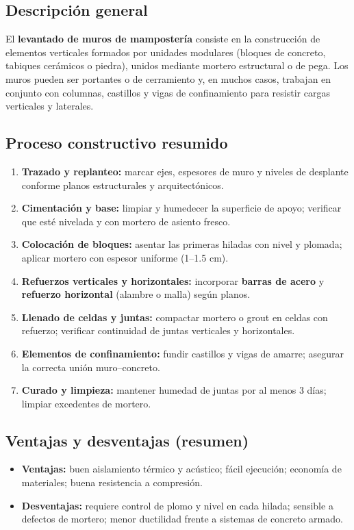 \documentclass[12pt]{article}
\begin{document}
	\subsection*{Descripción general}
	El \textbf{levantado de muros de mampostería} consiste en la construcción de elementos verticales formados por unidades modulares (bloques de concreto, tabiques cerámicos o piedra), unidos mediante mortero estructural o de pega. Los muros pueden ser portantes o de cerramiento y, en muchos casos, trabajan en conjunto con columnas, castillos y vigas de confinamiento para resistir cargas verticales y laterales.
	
	\subsection*{Proceso constructivo resumido}
	\begin{enumerate}[leftmargin=*, itemsep=2pt]
		\item \textbf{Trazado y replanteo:} marcar ejes, espesores de muro y niveles de desplante conforme planos estructurales y arquitectónicos.
		\item \textbf{Cimentación y base:} limpiar y humedecer la superficie de apoyo; verificar que esté nivelada y con mortero de asiento fresco.
		\item \textbf{Colocación de bloques:} asentar las primeras hiladas con nivel y plomada; aplicar mortero con espesor uniforme (1–1.5 cm).
		\item \textbf{Refuerzos verticales y horizontales:} incorporar \textbf{barras de acero} y \textbf{refuerzo horizontal} (alambre o malla) según planos.
		\item \textbf{Llenado de celdas y juntas:} compactar mortero o grout en celdas con refuerzo; verificar continuidad de juntas verticales y horizontales.
		\item \textbf{Elementos de confinamiento:} fundir castillos y vigas de amarre; asegurar la correcta unión muro–concreto.
		\item \textbf{Curado y limpieza:} mantener humedad de juntas por al menos 3 días; limpiar excedentes de mortero.
	\end{enumerate}
	
	\subsection*{Ventajas y desventajas (resumen)}
	\begin{itemize}[leftmargin=*, itemsep=2pt]
		\item \textbf{Ventajas:} buen aislamiento térmico y acústico; fácil ejecución; economía de materiales; buena resistencia a compresión.
		\item \textbf{Desventajas:} requiere control de plomo y nivel en cada hilada; sensible a defectos de mortero; menor ductilidad frente a sistemas de concreto armado.
	\end{itemize}
	
\end{document}
